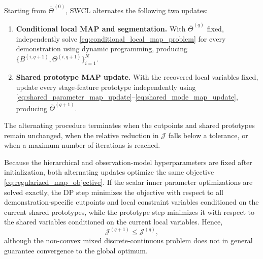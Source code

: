 \documentclass[lettersize,journal]{IEEEtran}
\begin{document}
Starting from $\bar{\Theta}^{(0)}$, SWCL alternates the following two updates:

\begin{enumerate}
    \item \textbf{Conditional local MAP and segmentation.}
    With $\bar{\Theta}^{(q)}$ fixed, independently solve
    \eqref{eq:conditional_local_map_problem} for every demonstration using
    dynamic programming, producing
    $\{B^{(i,q+1)},\Theta^{(i,q+1)}\}_{i=1}^{N}$.

    \item \textbf{Shared prototype MAP update.}
    With the recovered local variables fixed, update every stage-feature
    prototype independently using
    \eqref{eq:shared_parameter_map_update}--\eqref{eq:shared_mode_map_update},
    producing $\bar{\Theta}^{(q+1)}$.
\end{enumerate}

The alternating procedure terminates when the cutpoints and shared prototypes
remain unchanged, when the relative reduction in
$\mathcal{J}$ falls below a tolerance, or when a maximum number of iterations is
reached.

Because the hierarchical and observation-model hyperparameters are fixed after
initialization, both alternating updates optimize the same objective
\eqref{eq:regularized_map_objective}. If the scalar inner parameter
optimizations are solved exactly, the DP step minimizes the objective with
respect to all demonstration-specific cutpoints and local constraint variables
conditioned on the current shared prototypes, while the prototype step minimizes
it with respect to the shared variables conditioned on the current local
variables. Hence,
\begin{equation}
\mathcal{J}^{(q+1)}
\leq
\mathcal{J}^{(q)},
\label{eq:map_monotonicity}
\end{equation}
although the non-convex mixed discrete-continuous problem does not in general
guarantee convergence to the global optimum.
\end{document}
